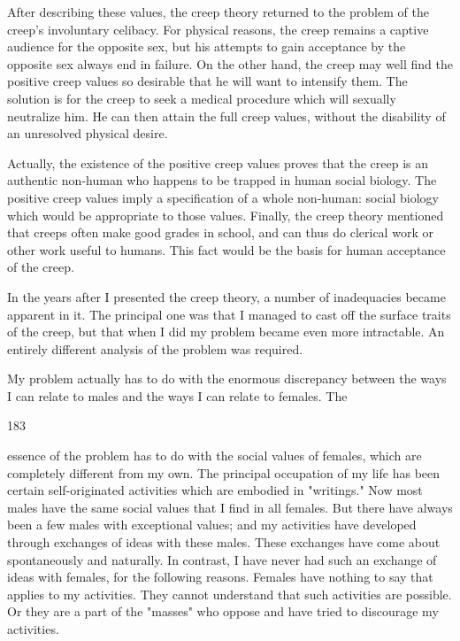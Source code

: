 \documentclass[10pt,twoside]{memoir}
\begin{document}
\begin{enumerate}
{\begin{enumerate}
\begin{sysrules}
\begin{sysrules}
\begin{sysrules}
\begin{sysrules}
{\begin{enumerate}
{{{{{{{After describing these values, the creep theory returned to the problem 
of the creep's involuntary celibacy. For physical reasons, the creep remains a 
captive audience for the opposite sex, but his attempts to gain acceptance by 
the opposite sex always end in failure. On the other hand, the creep may 
well find the positive creep values so desirable that he will want to intensify 
them. The solution is for the creep to seek a medical procedure which will 
sexually neutralize him. He can then attain the full creep values, without the 
disability of an unresolved physical desire. 

Actually, the existence of the positive creep values proves that the 
creep is an authentic non-human who happens to be trapped in human social 
biology. The positive creep values imply a specification of a whole 
non-human: social biology which would be appropriate to those values. 
Finally, the creep theory mentioned that creeps often make good grades in 
school, and can thus do clerical work or other work useful to humans. This 
fact would be the basis for human acceptance of the creep. 

In the years after I presented the creep theory, a number of 
inadequacies became apparent in it. The principal one was that I managed to 
cast off the surface traits of the creep, but that when I did my problem 
became even more intractable. An entirely different analysis of the problem 
was required. 

My problem actually has to do with the enormous discrepancy between 
the ways I can relate to males and the ways I can relate to females. The 


183 


essence of the problem has to do with the social values of females, which are 
completely different from my own. The principal occupation of my life has 
been certain self-originated activities which are embodied in "writings." Now 
most males have the same social values that I find in all females. But there 
have always been a few males with exceptional values; and my activities have 
developed through exchanges of ideas with these males. These exchanges 
have come about spontaneously and naturally. In contrast, I have never had 
such an exchange of ideas with females, for the following reasons. Females 
have nothing to say that applies to my activities. They cannot understand 
that such activities are possible. Or they are a part of the "masses" who 
oppose and have tried to discourage my activities. 

}}}}}}}
\end{enumerate}}
\end{sysrules}
\end{sysrules}
\end{sysrules}
\end{sysrules}
\end{enumerate}}
\end{enumerate}
\end{document}
